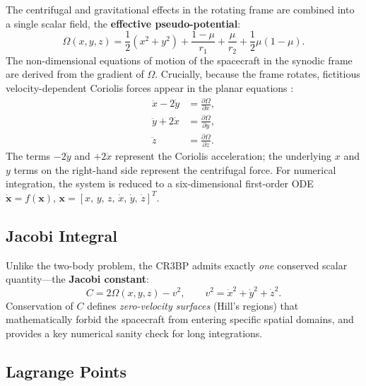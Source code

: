\documentclass[12pt, a4paper]{article}
\newcommand{\bfx}{\bm{x}}
\begin{document}
The centrifugal and gravitational effects in the rotating frame are
combined into a single scalar field, the \textbf{effective pseudo-potential}:
\begin{equation}
  \Omega(x,y,z) = \frac{1}{2}(x^2+y^2)
    + \frac{1-\mu}{r_1} + \frac{\mu}{r_2}
    + \frac{1}{2}\mu(1-\mu).
  \label{eq:pseudopotential}
\end{equation}
The non-dimensional equations of motion of the spacecraft in the synodic
frame are derived from the gradient of $\Omega$.
Crucially, because the frame rotates, fictitious velocity-dependent Coriolis
forces appear in the planar equations \citep{Szebehely1967,KoonLoMarsdenRoss2008}:
\begin{align}
  \ddot{x} - 2\dot{y} &= \frac{\partial \Omega}{\partial x}, \label{eq:eom_x}\\
  \ddot{y} + 2\dot{x} &= \frac{\partial \Omega}{\partial y}, \label{eq:eom_y}\\
  \ddot{z}             &= \frac{\partial \Omega}{\partial z}. \label{eq:eom_z}
\end{align}
The terms $-2\dot{y}$ and $+2\dot{x}$ represent the Coriolis acceleration;
the underlying $x$ and $y$ terms on the right-hand side represent the
centrifugal force.
For numerical integration, the system is reduced to a six-dimensional
first-order ODE $\dot{\bfx} = f(\bfx)$,
$\bfx = [x,\,y,\,z,\,\dot{x},\,\dot{y},\,\dot{z}]^T$.

\subsection{Jacobi Integral}

Unlike the two-body problem, the CR3BP admits exactly \emph{one} conserved
scalar quantity---the \textbf{Jacobi constant}:
\begin{equation}
  C = 2\Omega(x,y,z) - v^2,\qquad v^2 = \dot{x}^2+\dot{y}^2+\dot{z}^2.
  \label{eq:jacobi}
\end{equation}
Conservation of $C$ defines \emph{zero-velocity surfaces} (Hill's regions)
that mathematically forbid the spacecraft from entering specific spatial
domains, and provides a key numerical sanity check for long integrations.

\subsection{Lagrange Points}
\label{ssec:lagrange}
\end{document}
